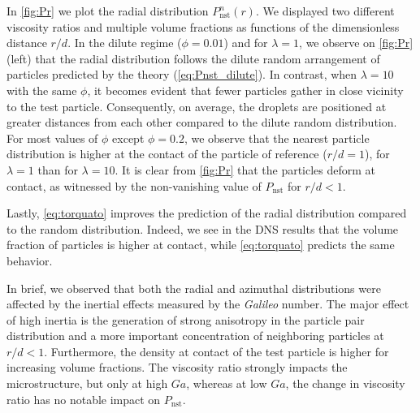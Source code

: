 In \ref{fig:Pr}  we plot the radial distribution $P_\text{nst}^n(r)$. %
We displayed two different viscosity ratios and multiple volume fractions as functions of the dimensionless distance $r/d$. 
In the dilute regime ($\phi = 0.01$) and for $\lambda=1$, we observe on \ref{fig:Pr} (left) that the radial distribution follows the dilute random arrangement of particles predicted by the theory (\ref{eq:Pnst_dilute}). 
In contrast, when $\lambda = 10$ with the same $\phi$, it becomes evident that fewer particles gather in close vicinity to the test particle. Consequently, on average, the droplets are positioned at greater distances from each other compared to the dilute random distribution. 
For most values of $\phi$ except $\phi=0.2$, we observe that the nearest particle distribution is higher at the contact of the particle of reference ($r/d = 1$), for $\lambda = 1$ than for $\lambda = 10$. 
It is clear from \ref{fig:Pr} that the particles deform at contact, as witnessed by the non-vanishing value of $P_\text{nst}$ for $r/d<1$.

Lastly, \ref{eq:torquato} improves the prediction of the radial distribution compared to the random distribution. 
Indeed, we see in the DNS results that the volume fraction of particles is higher at contact, while \ref{eq:torquato} predicts the same behavior. 

In brief, we observed that both the radial and azimuthal distributions were affected by the inertial effects measured by the \textit{Galileo} number. 
The major effect of high inertia is the generation of strong anisotropy in the particle pair distribution and a more important concentration of neighboring particles at $r/d < 1$. 
Furthermore, the density at contact of the test particle is higher for increasing volume fractions. 
The viscosity ratio strongly impacts the microstructure, but only at high $Ga$, whereas at low $Ga$, the change in viscosity ratio has no notable impact on $P_\text{nst}$. 

